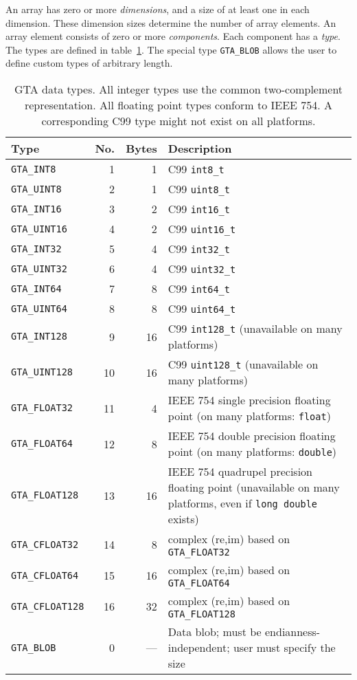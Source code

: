 \documentclass[a4paper,11pt]{article}
\newcommand{\code}[1]{\texttt{#1}}
\begin{document}
An array has zero or more \emph{dimensions}, and a size of at least one in each
dimension. These dimension sizes determine the number of array elements.
An array element consists of zero or more \emph{components}.
Each component has a \emph{type}. The types are defined in table~\ref{tab:types}.
The special type \code{GTA\_BLOB} allows the user to define custom types
of arbitrary length.

\begin{table}
\begin{tabular}{l|r|r|p{}}
Type & No. & Bytes & Description\\\hline
\code{GTA\_INT8}      &  1 & 1		& C99 \code{int8\_t}		\\
\code{GTA\_UINT8}     &  2 & 1 		& C99 \code{uint8\_t}		\\
\code{GTA\_INT16}     &  3 & 2 		& C99 \code{int16\_t}		\\
\code{GTA\_UINT16}    &  4 & 2 		& C99 \code{uint16\_t} 	\\
\code{GTA\_INT32}     &  5 & 4 		& C99 \code{int32\_t}		\\
\code{GTA\_UINT32}    &  6 & 4 		& C99 \code{uint32\_t}		\\
\code{GTA\_INT64}     &  7 & 8 		& C99 \code{int64\_t} 		\\
\code{GTA\_UINT64}    &  8 & 8 		& C99 \code{uint64\_t}		\\
\code{GTA\_INT128}    &  9 & 16		& C99 \code{int128\_t} (unavailable on many platforms)		\\
\code{GTA\_UINT128}   & 10 & 16		& C99 \code{uint128\_t} (unavailable on many platforms)		\\
\code{GTA\_FLOAT32}   & 11 & 4 		& IEEE 754 single precision floating point (on many platforms: \code{float}) \\
\code{GTA\_FLOAT64}   & 12 & 8 		& IEEE 754 double precision floating point (on many platforms: \code{double}) \\
\code{GTA\_FLOAT128}  & 13 & 16		& IEEE 754 quadrupel precision floating point (unavailable on many platforms, even if \code{long double} exists) \\
\code{GTA\_CFLOAT32}  & 14 & 8		& complex (re,im) based on \code{GTA\_FLOAT32} \\
\code{GTA\_CFLOAT64}  & 15 & 16		& complex (re,im) based on \code{GTA\_FLOAT64} \\
\code{GTA\_CFLOAT128} & 16 & 32		& complex (re,im) based on \code{GTA\_FLOAT128} \\
\code{GTA\_BLOB}      &  0 & ---    	& Data blob; must be endianness-independent; user must specify the size \\
\end{tabular}
\caption{GTA data types. All integer types use the common two-complement
representation. All floating point types conform to IEEE 754. A corresponding
C99 type might not exist on all platforms.}
\label{tab:types}
\end{table}
\end{document}
